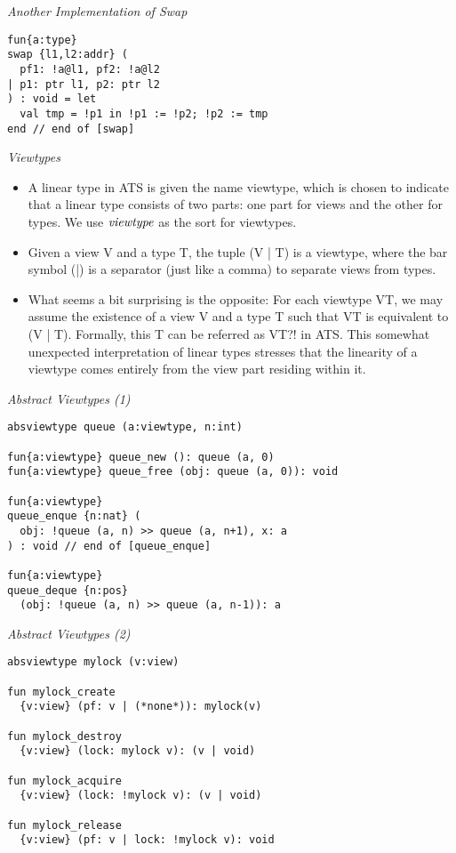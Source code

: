 \documentclass[pdf]{prosper}
\begin{document}
\begin{slide}{\em Another Implementation of {\it Swap}}
{\blue\begin{verbatim}
fun{a:type}
swap {l1,l2:addr} (
  pf1: !a@l1, pf2: !a@l2
| p1: ptr l1, p2: ptr l2
) : void = let
  val tmp = !p1 in !p1 := !p2; !p2 := tmp
end // end of [swap]
\end{verbatim}
}
\end{slide}
\def\VT{{\it VT}}
\def\sviewtype{{\it viewtype}}
\begin{slide}{\em Viewtypes}
\begin{itemize}
\item
A linear type in ATS is given the name viewtype, which is chosen to
indicate that a linear type consists of two parts: one part for views and
the other for types. We use $\sviewtype$ as the sort for viewtypes.
\item Given a view V and a type T, the
tuple (V | T) is a viewtype, where the bar symbol (|) is a separator (just
like a comma) to separate views from types.
\item
What seems a bit surprising is the opposite: For each viewtype VT, we may
assume the existence of a view V and a type T such that VT is equivalent to
(V | T). Formally, this T can be referred as VT?! in ATS. This somewhat
unexpected interpretation of linear types stresses that the linearity of a
viewtype comes entirely from the view part residing within it.
\end{itemize}
\vfill
\end{slide}
\begin{slide}{\em Abstract Viewtypes (1)}
{\blue\begin{verbatim}
absviewtype queue (a:viewtype, n:int)

fun{a:viewtype} queue_new (): queue (a, 0)
fun{a:viewtype} queue_free (obj: queue (a, 0)): void

fun{a:viewtype}
queue_enque {n:nat} (
  obj: !queue (a, n) >> queue (a, n+1), x: a
) : void // end of [queue_enque]

fun{a:viewtype}
queue_deque {n:pos}
  (obj: !queue (a, n) >> queue (a, n-1)): a
\end{verbatim}
}
\end{slide}
\begin{slide}{\em Abstract Viewtypes (2)}
{\blue\begin{verbatim}
absviewtype mylock (v:view)

fun mylock_create
  {v:view} (pf: v | (*none*)): mylock(v)

fun mylock_destroy
  {v:view} (lock: mylock v): (v | void)

fun mylock_acquire
  {v:view} (lock: !mylock v): (v | void)

fun mylock_release
  {v:view} (pf: v | lock: !mylock v): void
\end{verbatim}
}
\end{slide}
\end{document}
